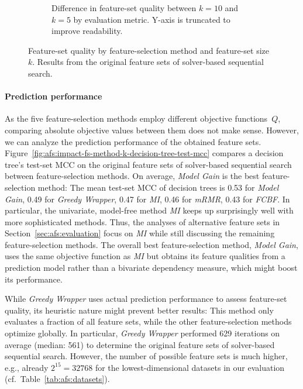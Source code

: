 \documentclass{article}
\theoremstyle{definition}
\begin{document}
\begin{figure}[t]
\begin{subfigure}[t]{0.48\textwidth}
		\caption{
			Difference in feature-set quality between $k=10$ and $k=5$ by evaluation metric.
			Y-axis is truncated to improve readability.
		}
		\label{fig:afs:impact-fs-method-k-metric-diff}
	\end{subfigure}
	\caption{
		Feature-set quality by feature-selection method and feature-set size~$k$.
		Results from the original feature sets of solver-based sequential search.
	}
	\label{fig:afs:impact-fs-method-k-quality}
\end{figure}

\paragraph{Prediction performance}

As the five feature-selection methods employ different objective functions~$Q$, comparing absolute objective values between them does not make sense.
However, we can analyze the prediction performance of the obtained feature sets.
Figure~\ref{fig:afs:impact-fs-method-k-decision-tree-test-mcc} compares a decision tree's test-set MCC on the original feature sets of solver-based sequential search between feature-selection methods.
On average, \emph{Model Gain} is the best feature-selection method:
The mean test-set MCC of decision trees is 0.53 for \emph{Model Gain}, 0.49 for \emph{Greedy Wrapper}, 0.47 for \emph{MI}, 0.46 for \emph{mRMR}, 0.43 for \emph{FCBF}.
In particular, the univariate, model-free method \emph{MI} keeps up surprisingly well with more sophisticated methods.
Thus, the analyses of alternative feature sets in Section~\ref{sec:afs:evaluation} focus on \emph{MI} while still discussing the remaining feature-selection methods.
The overall best feature-selection method, \emph{Model Gain}, uses the same objective function as \emph{MI} but obtains its feature qualities from a prediction model rather than a bivariate dependency measure, which might boost its performance. 

While \emph{Greedy Wrapper} uses actual prediction performance to assess feature-set quality, its heuristic nature might prevent better results:
This method only evaluates a fraction of all feature sets, while the other feature-selection methods optimize globally.
In particular, \emph{Greedy Wrapper} performed 629 iterations on average (median: 561) to determine the original feature sets of solver-based sequential search.
However, the number of possible feature sets is much higher, e.g., already $2^{15}=32768$ for the lowest-dimensional datasets in our evaluation (cf.~Table~\ref{tab:afs:datasets}).
\end{document}
